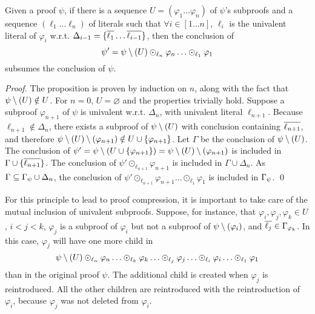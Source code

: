 \documentclass{llncs}
\begin{document}
\begin{proposition} \label{prop:LUniv}
Given a proof $\psi$, if 
there is a sequence $U = (\varphi_1 \ldots \varphi_n)$
of $\psi$'s subproofs and a sequence $(\ell_1 \ldots \ell_n)$ of literals such that $\forall i \in
[1 \ldots n]$, $\ell_i$ is the univalent literal of $\varphi_i$ w.r.t. $\Delta_{i-1} =
\{\overline{\ell_1} \ldots \overline{\ell_{i-1}}\}$, then the conclusion of $$ \psi' = \psi \setminus (U)
\odot_{\ell_n} \varphi_n \ldots \odot_{\ell_1} \varphi_1 $$ subsumes the conclusion of $\psi$.
\end{proposition}

\begin{proof}
The proposition is proven by induction on $n$, along with the fact that $\psi \setminus (U) \notin U$.
For $n = 0$, $U = \varnothing$ and the properties trivially hold. Suppose a subproof
$\varphi_{n+1}$ of $\psi$ is univalent w.r.t. $\Delta_n$, with univalent literal $\ell_{n+1}$.
Because $\ell_{n+1} \notin \Delta_n$, there exists a subproof of $\psi \setminus (U)$ with conclusion
containing $\overline{\ell_{n+1}}$, and therefore $\psi \setminus (U) \setminus (\varphi_{n+1}) \notin U \cup
\{\varphi_{n+1}\}$.  Let $\Gamma$ be the conclusion of $\psi \setminus (U)$. The conclusion of $ \psi' =
\psi \setminus (U \cup \{\varphi_{n+1}\}) = \psi \setminus (U) \setminus (\varphi_{n+1}) $ is included in $\Gamma \cup
\{\overline{\ell_{n+1}}\}$. The conclusion of $\psi' \odot_{\ell_{n+1}} \varphi_{n+1}$ is included in
$\Gamma \cup \Delta_n$. As $\Gamma \subseteq \Gamma_{\psi} \cup \Delta_n$, the conclusion of
$\psi' \odot_{\ell_{n+1}} \varphi_{n+1} \ldots \odot_{\ell_1} \varphi_1$ is included in
$\Gamma_{\psi}$. \qed
\end{proof}

For this principle to lead to proof compression, it is important to take care
of the mutual inclusion of univalent subproofs.
Suppose, for instance, that $\varphi_i, \varphi_j, \varphi_k \in U$, $i < j < k$, $\varphi_j$ is a
subproof of $\varphi_i$ but not a subproof of $\psi \setminus (\varphi_i)$, and $\overline{\ell_j} \in
\Gamma_{\varphi_k}$.  In this case, $\varphi_j$ will have one more child in
$$
\psi \setminus (U) \odot_{\ell_n} \varphi_n \ldots \odot_{\ell_k} \varphi_k \ldots \odot_{\ell_j} \varphi_j \ldots \odot_{\ell_i} \varphi_i \ldots \odot_{\ell_1} \varphi_1
$$
than in the original proof $\psi$. The additional child is created when $\varphi_j$ is reintroduced.
All the other children are reintroduced with the reintroduction of $\varphi_i$, because
$\varphi_j$ was not deleted from $\varphi_i$.
\end{document}
